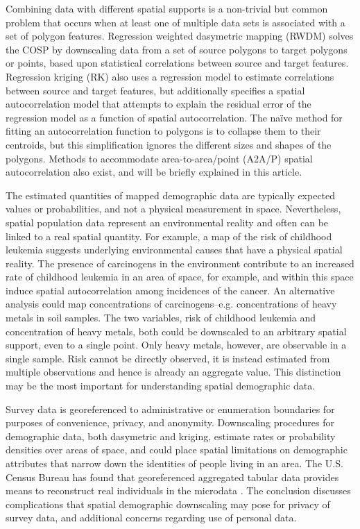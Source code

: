 \documentclass[draft]{article}
\begin{document}
Combining data with different spatial supports is a non-trivial but common problem that occurs when at least one of multiple data sets is associated with a set of polygon features.  Regression weighted dasymetric mapping (RWDM) solves the COSP by downscaling data from a set of source polygons to target polygons or points, based upon statistical correlations between source and target features.  Regression kriging (RK) also uses a regression model to estimate correlations between source and target features, but additionally specifies a spatial autocorrelation model that attempts to explain the residual error of the regression  model as a function of spatial autocorrelation.  The na\"{i}ve method for fitting an autocorrelation function to polygons is to collapse them to their centroids, but this simplification ignores the different sizes and shapes of the polygons.  Methods to accommodate area-to-area/point (A2A/P) spatial autocorrelation also exist, and will be briefly explained in this article.

The estimated quantities of mapped demographic data are typically expected values or probabilities, and not a physical measurement in space.  Nevertheless, spatial population data represent an environmental reality and often can be linked to a real spatial quantity.  For example, a map of the risk of childhood leukemia suggests underlying environmental causes that have a physical spatial reality.  The presence of carcinogens in the environment contribute to an increased rate of childhood leukemia in an area of space, for example, and within this space induce spatial autocorrelation among incidences of the cancer.  An alternative analysis could map concentrations of carcinogens--e.g. concentrations of heavy metals in soil samples.  The two variables, risk of childhood leukemia and concentration of heavy metals, both could be downscaled to an arbitrary spatial support, even to a single point.  Only heavy metals, however, are observable in a single sample.  Risk cannot be directly observed, it is instead estimated from multiple observations and hence is already an aggregate value.  This distinction may be the most important for understanding spatial demographic data.

Survey data is georeferenced to administrative or enumeration boundaries for purposes of convenience, privacy, and anonymity.  Downscaling procedures for demographic data, both dasymetric and kriging, estimate rates or probability densities over areas of space, and could place spatial limitations on demographic attributes that narrow down the identities of people living in an area.  The U.S. Census Bureau has found that georeferenced aggregated tabular data provides means to reconstruct real individuals in the microdata \cite{}.  The conclusion discusses complications that spatial demographic downscaling may pose for privacy of survey data, and additional concerns regarding use of personal data.
\end{document}
